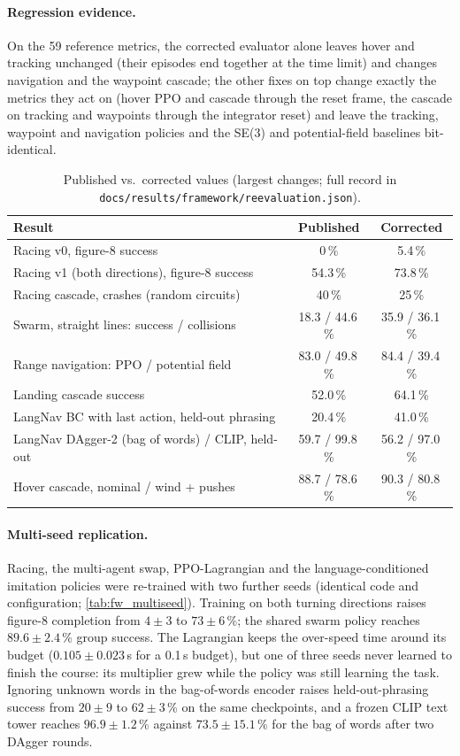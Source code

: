 \paragraph{Regression evidence.} On the 59 reference metrics, the corrected evaluator alone leaves hover and tracking
unchanged (their episodes end together at the time limit) and changes navigation and the waypoint cascade; the
other fixes on top change exactly the metrics they act on (hover PPO and cascade through the reset frame, the
cascade on tracking and waypoints through the integrator reset) and leave the tracking, waypoint and navigation
policies and the SE(3) and potential-field baselines bit-identical.

\begin{table}[!htbp]\centering\small
\caption{Published vs.\ corrected values (largest changes; full record in
\texttt{docs/results/framework/reevaluation.json}).}\label{tab:reeval}
\begin{tabular}{lcc}\toprule
Result & Published & Corrected\\\midrule
Racing v0, figure-8 success & 0\,\% & 5.4\,\% \\
Racing v1 (both directions), figure-8 success & 54.3\,\% & 73.8\,\% \\
Racing cascade, crashes (random circuits) & 40\,\% & 25\,\% \\
Swarm, straight lines: success / collisions & 18.3 / 44.6\,\% & 35.9 / 36.1\,\% \\
Range navigation: PPO / potential field & 83.0 / 49.8\,\% & 84.4 / 39.4\,\% \\
Landing cascade success & 52.0\,\% & 64.1\,\% \\
LangNav BC with last action, held-out phrasing & 20.4\,\% & 41.0\,\% \\
LangNav DAgger-2 (bag of words) / CLIP, held-out & 59.7 / 99.8\,\% & 56.2 / 97.0\,\% \\
Hover cascade, nominal / wind + pushes & 88.7 / 78.6\,\% & 90.3 / 80.8\,\% \\
\bottomrule\end{tabular}
\end{table}

\paragraph{Multi-seed replication.} Racing, the multi-agent swap, PPO-Lagrangian and the language-conditioned
imitation policies were re-trained with two further seeds (identical code and configuration;
\cref{tab:fw_multiseed}). Training on both turning directions raises figure-8 completion from $4\pm3$ to
$73\pm6$\,\%; the shared swarm policy reaches $89.6\pm2.4$\,\% group success. The Lagrangian keeps the over-speed time
around its budget ($0.105\pm0.023$\,s for a 0.1\,s budget), but one of three seeds never learned to finish the course:
its multiplier grew while the policy was still learning the task. Ignoring unknown words in the bag-of-words encoder
raises held-out-phrasing success from $20\pm9$ to $62\pm3$\,\% on the same checkpoints, and a frozen CLIP text tower
reaches $96.9\pm1.2$\,\% against $73.5\pm15.1$\,\% for the bag of words after two DAgger rounds.

